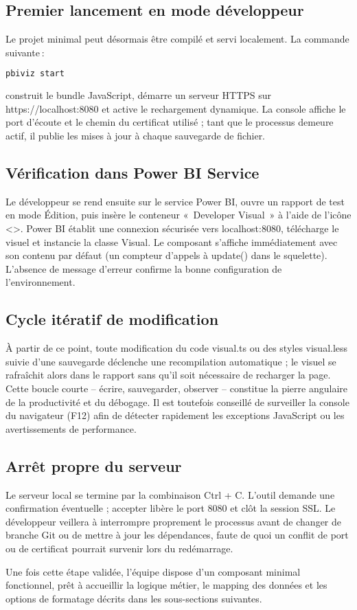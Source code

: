 \subsection{Premier lancement en mode développeur}

Le projet minimal peut désormais être compilé et servi localement. La commande suivante :
\begin{lstlisting}[language=bash]
pbiviz start
\end{lstlisting}
construit le bundle JavaScript, démarre un serveur HTTPS sur https://localhost:8080 et active le rechargement dynamique. La console affiche le port d’écoute et le chemin du certificat utilisé ; tant que le processus demeure actif, il publie les mises à jour à chaque sauvegarde de fichier.

\subsection{Vérification dans Power BI Service}

Le développeur se rend ensuite sur le service Power BI, ouvre un rapport de test en mode Édition, puis insère le conteneur «~Developer Visual~» à l’aide de l’icône \textless{}\textgreater{}. Power BI établit une connexion sécurisée vers localhost:8080, télécharge le visuel et instancie la classe Visual. Le composant s’affiche immédiatement avec son contenu par défaut (un compteur d’appels à update() dans le squelette). L’absence de message d’erreur confirme la bonne configuration de l’environnement.

\subsection{Cycle itératif de modification}

À partir de ce point, toute modification du code visual.ts ou des styles visual.less suivie d’une sauvegarde déclenche une recompilation automatique ; le visuel se rafraîchit alors dans le rapport sans qu’il soit nécessaire de recharger la page. Cette boucle courte – écrire, sauvegarder, observer – constitue la pierre angulaire de la productivité et du débogage. Il est toutefois conseillé de surveiller la console du navigateur (F12) afin de détecter rapidement les exceptions JavaScript ou les avertissements de performance.

\subsection{Arrêt propre du serveur}

Le serveur local se termine par la combinaison Ctrl + C. L’outil demande une confirmation éventuelle ; accepter libère le port 8080 et clôt la session SSL. Le développeur veillera à interrompre proprement le processus avant de changer de branche Git ou de mettre à jour les dépendances, faute de quoi un conflit de port ou de certificat pourrait survenir lors du redémarrage.



Une fois cette étape validée, l’équipe dispose d’un composant minimal fonctionnel, prêt à accueillir la logique métier, le mapping des données et les options de formatage décrits dans les sous-sections suivantes.
